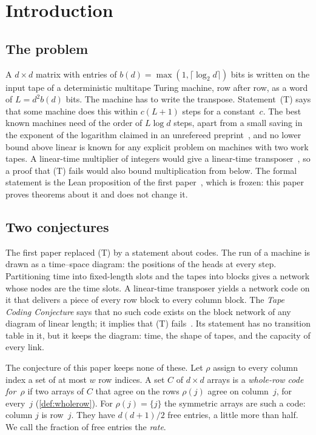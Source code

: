 \section{Introduction}\label{sec:intro}

\subsection{The problem}\label{sec:intro-problem}

A $d\times d$ matrix with entries of $b(d)=\max(1,\lceil\log_2d\rceil)$ bits is written on the input tape of a
deterministic multitape Turing machine, row after row, as a word of $L=d^2b(d)$ bits. The machine has to write the
transpose. Statement~(T) says that some machine does this within $c(L+1)$ steps for a constant~$c$. The best known
machines need of the order of $L\log d$ steps, apart from a small saving in the exponent of the logarithm claimed in an
unrefereed preprint~\cite{OpenAI2026mult}, and no lower bound above linear is known for any explicit problem on machines with two work tapes. A
linear-time multiplier of integers would give a linear-time transposer~\cite{HvdH2025}, so a proof that (T) fails would
also bound multiplication from below. The formal statement is the Lean proposition
 of the first paper~\cite{FirstPaper2026}, which is frozen: this paper proves
theorems about it and does not change it.

\subsection{Two conjectures}\label{sec:intro-two}

The first paper replaced (T) by a statement about codes. The run of a machine is drawn as a time--space diagram: the
positions of the heads at every step. Partitioning time into fixed-length slots and the tapes into blocks gives a
network whose nodes are the time slots. A linear-time transposer yields a network code on it that delivers a piece
of every row block to every column block. The \emph{Tape Coding Conjecture} says that no such code exists on the block network of any
diagram of linear length; it implies that (T) fails~\cite[Conjecture~9.1 and Theorem~9.2]{FirstPaper2026}. Its
statement has no transition table in it, but it keeps the diagram: time, the shape of tapes, and the capacity of
every link.

The conjecture of this paper keeps none of these. Let $\rho$ assign to every column index a set of at most $w$ row
indices. A set $C$ of $d\times d$ arrays is a \emph{whole-row code for~$\rho$} if two arrays of $C$ that agree on the
rows $\rho(j)$ agree on column~$j$, for every~$j$ (\cref{def:wholerow}). For $\rho(j)=\{j\}$ the symmetric arrays are
such a code: column $j$ is row~$j$. They have $d(d+1)/2$ free entries, a little more than half. We call the fraction
of free entries the \emph{rate}.

